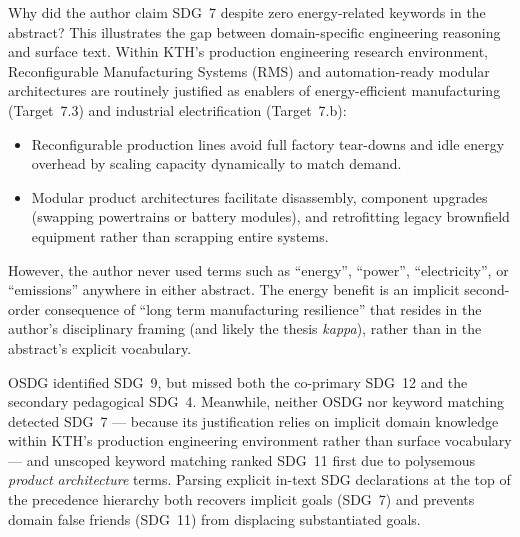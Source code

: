 \begin{casestudySection}
Why did the author claim \gls{SDG}~7 despite zero energy-related keywords in the abstract? This illustrates the gap between domain-specific engineering reasoning and surface text. Within \gls{KTH}'s production engineering research environment, Reconfigurable Manufacturing Systems (RMS) and automation-ready modular architectures are routinely justified as enablers of energy-efficient manufacturing (Target~7.3) and industrial electrification (Target~7.b):
\begin{itemize}
    \item Reconfigurable production lines avoid full factory tear-downs and idle energy overhead by scaling capacity dynamically to match demand.
    
    \item Modular product architectures facilitate disassembly, component upgrades (\eg swapping powertrains or battery modules), and retrofitting legacy brownfield equipment rather than scrapping entire systems.
\end{itemize}

However, the author never used terms such as \enquote{energy}, \enquote{power}, \enquote{electricity}, or \enquote{emissions} anywhere in either abstract. The energy benefit is an implicit second-order consequence of \enquote{long term manufacturing resilience} that resides in the author's disciplinary framing (and likely the thesis \textit{kappa}), rather than in the abstract's explicit vocabulary.
\end{casestudySection}

\begin{takeaway}
OSDG identified \gls{SDG}~9, but missed both the co-primary \gls{SDG}~12 and the secondary pedagogical \gls{SDG}~4. Meanwhile, neither OSDG nor keyword matching detected \gls{SDG}~7 --- because its justification relies on implicit domain knowledge within \gls{KTH}'s production engineering environment rather than surface vocabulary --- and unscoped keyword matching ranked \gls{SDG}~11 first due to polysemous \emph{product architecture} terms. Parsing explicit in-text \gls{SDG} declarations at the top of the precedence hierarchy both recovers implicit goals (\gls{SDG}~7) and prevents domain false friends (\gls{SDG}~11) from displacing substantiated goals.
\end{takeaway}

